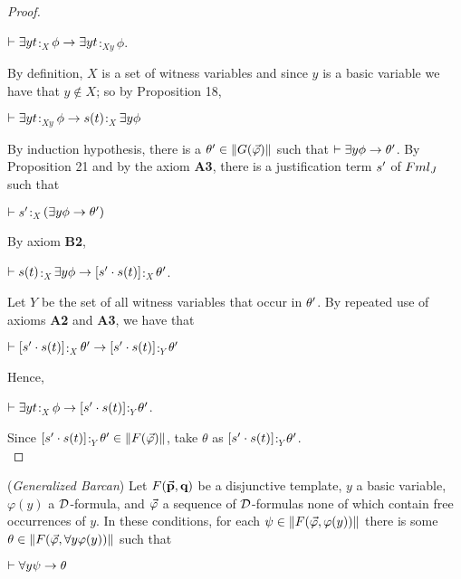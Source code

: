 \begin{proof}
	
	\begin{center}
		$\vdash \exists y t$$:_{X}$$\phi \rightarrow \exists y t$$:_{Xy}$$\phi$.
	\end{center}     
	
	\qquad By definition, $X$ is a set of witness variables and since $y$ is a basic variable we have that $y \notin X$; so by Proposition 18,
	
	\begin{center}
		$\vdash \exists y t$$:_{Xy}$$\phi \rightarrow s(t)$$:_{X}$$\exists y \phi$
	\end{center}
	
	
	
	\qquad By induction hypothesis, there is a $\theta^{\prime} \in \Arrowvert G(\vec{\varphi}) \Arrowvert$ such that $\vdash \exists y \phi \rightarrow \theta^{\prime}$. By Proposition 21 and by the axiom \textbf{A3}, there is a justification term $s^{\prime}$ of $Fml_{J}$ such that
	
	\begin{center}
		$\vdash s^{\prime}$$:_{X}$$(\exists y \phi \rightarrow \theta^{\prime})$
	\end{center}    
By axiom \textbf{B2},    
	
	
	\begin{center}
		$\vdash s(t)$$:_{X}$$\exists y \phi \rightarrow [s^{\prime} \cdot s(t)]$$:_{X}$$\theta^{\prime}$.
	\end{center}
	
	\qquad Let $Y$ be the set of all witness variables that occur in $\theta^{\prime}$. By repeated use of axioms \textbf{A2} and \textbf{A3}, we have that
	
	
	\begin{center}
		$\vdash [s^{\prime} \cdot s(t)]$$:_{X}$$\theta^{\prime} \rightarrow  [s^{\prime} \cdot s(t)]$$:_{Y}$$\theta^{\prime}$
	\end{center} 
Hence, 
	
	\begin{center}
		$\vdash \exists y t$$:_{X}$$\phi \rightarrow [s^{\prime} \cdot s(t)]$$:_{Y}$$\theta^{\prime}$.
	\end{center}
	
	
	\qquad Since $[s^{\prime} \cdot s(t)]$$:_{Y}$$\theta^{\prime} \in \Arrowvert F(\vec{\varphi}) \Arrowvert$, take $\theta$ as $[s^{\prime} \cdot s(t)]$$:_{Y}$$\theta^{\prime}$.\\    
	
\end{proof}


\begin{pro}(\textit{Generalized Barcan})
	Let $F(\vec{\textbf{p}},\textbf{q})$ be a disjunctive template, $y$ a basic variable, $\varphi(y)$ a $\mathcal{D}$-formula, and  $\vec{\varphi}$ a sequence of $\mathcal{D}$-formulas none of which contain free occurrences of $y$. In these conditions, for each $\psi \in \Arrowvert F(\vec{\varphi},\varphi(y)) \Arrowvert$ there is some $\theta \in \Arrowvert F(\vec{\varphi},\forall y \varphi(y)) \Arrowvert$ such that
	
	
	\begin{center}
		$\vdash \forall y\psi \rightarrow \theta$
	\end{center}    
\end{pro}

